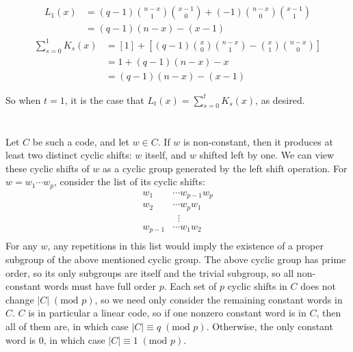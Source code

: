 \documentclass[11pt]{article}
\begin{document}
\renewcommand{\thesubsection}{\thesection.\alph{subsection}}
\section{} %
\begin{align*}
	L_1(x) &= (q-1)\binom{n-x}{1}\binom{x-1}{0} + (-1)\binom{n-x}{0}\binom{x-1}{1}\\
		   &= (q-1)(n-x) - (x-1)
\end{align*}
\begin{align*}
	\sum_{s=0}^1K_s(x) &= \left[1\right] + \left[(q-1)\binom{x}{0}\binom{n-x}{1} - \binom{x}{1}\binom{n-x}{0}\right]\\
					  &= 1 + (q-1)(n-x)-x\\
					  &= (q-1)(n-x)-(x-1)
\end{align*}

So when $t=1$, it is the case that $L_t(x)=\sum_{s=0}^tK_s(x)$, as desired.


\section{} %
Let $C$ be such a code, and let $w\in C$.
If $w$ is non-constant, then it produces at least two distinct cyclic shifts: $w$ itself, and $w$ shifted left by one.
We can view these cyclic shifts of $w$ as a cyclic group generated by the left shift operation.
For $w=w_1\cdots w_p$, consider the list of its cyclic shifts:\\
\begin{align*}
	w_1&\cdots w_{p-1}w_p\\
	w_2&\cdots w_pw_1\\
	   &\;\;\vdots\\
w_{p-1}&\cdots w_1w_2\\
\end{align*}
For any $w$, any repetitions in this list would imply the existence of a proper subgroup of the above mentioned cyclic group.
The above cyclic group has prime order, so its only subgroups are itself and the trivial subgroup, so all non-constant words must have full order $p$.
Each set of $p$ cyclic shifts in $C$ does not change $|C|\;(\text{mod } p)$, so we need only consider the remaining constant words in $C$.
$C$ is in particular a linear code, so if one nonzero constant word is in $C$, then all of them are, in which case $|C|\equiv q\;(\text{mod }p)$.
Otherwise, the only constant word is 0, in which case $|C|\equiv 1\;(\text{mod }p)$.
\end{document}
